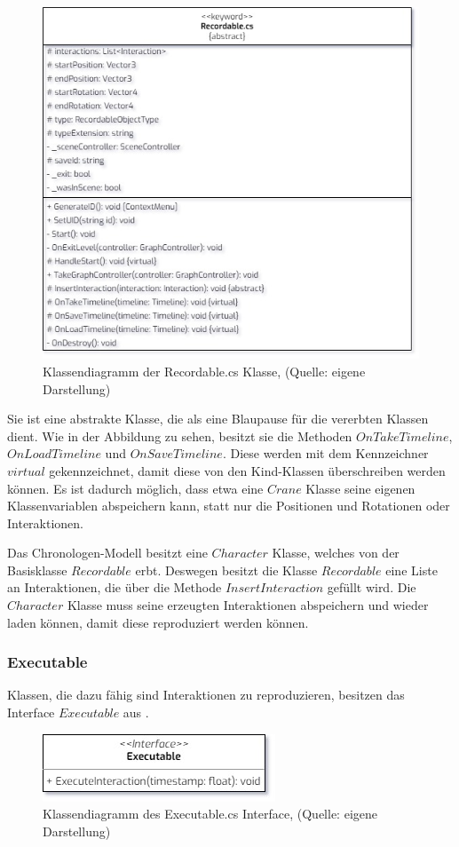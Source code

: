 \begin{figure}[ht]
\centering
\includegraphics[width=0.6\linewidth]{content/pictures/Recordable.jpg}
\caption{Klassendiagramm der Recordable.cs Klasse, (Quelle: eigene Darstellung)}
\label{fig:recordable-cs}
\end{figure}

Sie ist eine abstrakte Klasse, die als eine Blaupause für die vererbten Klassen dient. Wie in der Abbildung zu sehen, besitzt sie die Methoden $OnTakeTimeline$, \\ $OnLoadTimeline$ und $OnSaveTimeline$. Diese werden mit dem Kennzeichner $virtual$ gekennzeichnet, damit diese von den Kind-Klassen überschreiben werden können. Es ist dadurch möglich, dass etwa eine $Crane$ Klasse seine eigenen Klassenvariablen abspeichern kann, statt nur die Positionen und Rotationen oder Interaktionen.

Das Chronologen-Modell besitzt eine $Character$ Klasse, welches von der Basisklasse $Recordable$ erbt. Deswegen besitzt die Klasse $Recordable$ eine Liste an Interaktionen, die über die Methode $InsertInteraction$ gefüllt wird. Die $Character$ Klasse muss seine erzeugten Interaktionen abspeichern und wieder laden können, damit diese reproduziert werden können.
\newpage
\subsubsection{Executable}
Klassen, die dazu fähig sind Interaktionen zu reproduzieren, besitzen das Interface $Executable$ aus .

\begin{figure}[ht]
\centering
\includegraphics[width=0.4\linewidth]{content/pictures/Executable.jpg}
\caption{Klassendiagramm des Executable.cs Interface, (Quelle: eigene Darstellung)}
\label{fig:executable-cs}
\end{figure}

